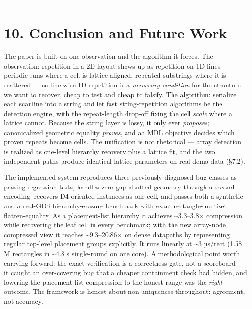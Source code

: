\documentclass[
  11pt,
]{article}
\begin{document}
\begin{center}\rule{0.5\linewidth}{0.5pt}\end{center}

\section{10. Conclusion and Future
Work}\label{conclusion-and-future-work}

The paper is built on one observation and the algorithm it forces. The
observation: repetition in a 2D layout shows up as repetition on 1D
lines --- periodic runs where a cell is lattice-aligned, repeated
substrings where it is scattered --- so line-wise 1D repetition is a
\emph{necessary condition} for the structure we want to recover, cheap
to test and cheap to falsify. The algorithm: serialize each scanline
into a string and let fast string-repetition algorithms be the detection
engine, with the repeat-length drop-off fixing the cell \emph{scale}
where a lattice cannot. Because the string layer is lossy, it only ever
\emph{proposes}; canonicalized geometric equality \emph{proves}, and an
MDL objective decides which proven repeats become cells. The unification
is not rhetorical --- array detection is realized as one-level hierarchy
recovery plus a lattice fit, and the two independent paths produce
identical lattice parameters on real demo data (§7.2).

The implemented system reproduces three previously-diagnosed bug classes
as passing regression tests, handles zero-gap abutted geometry through a
second encoding, recovers D4-oriented instances as one cell, and passes
both a synthetic and a real-GDS hierarchy-erasure benchmark with exact
rectangle-multiset flatten-equality. As a placement-list hierarchy it
achieves \textasciitilde3.3--3.8× compression while recovering the leaf
cell in every benchmark; with the new array-node compressed view it
reaches \textasciitilde9.3--20.86× on dense datapaths by representing
regular top-level placement groups explicitly. It runs linearly at
\textasciitilde3 µs/rect (1.58 M rectangles in \textasciitilde4.8 s
single-round on one core). A methodological point worth carrying
forward: the exact verification is a correctness gate, not a scoreboard
--- it caught an over-covering bug that a cheaper containment check had
hidden, and lowering the placement-list compression to the honest range
was the \emph{right} outcome. The framework is honest about
non-uniqueness throughout: agreement, not accuracy.
\end{document}
